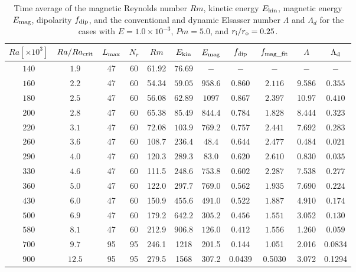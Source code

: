\begin{table}
\caption{Time average of the magnetic Reynolds number $Rm$, kinetic energy $E_{\rm kin}$, magnetic energy $E_{\rm mag}$, dipolarity $f_{\rm dip}$, and {\color{red} the conventional and dynamic Elsasser number $\Lambda$ and $\Lambda_{d}$ for the cases with $E = 1.0 \times 10^{-3}$, $Pm = 5.0$, and} $r_{\rm i}/r_{\rm o} = 0.25$.}
  \begin{tabular}{ccccccccccc}
    \hline
     $Ra[\times 10^3]$  &  $Ra/Ra_{\rm crit}$& 
     {\color{red} $L_{\rm max}$} & {\color{red} $N_{r}$} & {\color{red} $Rm$} & $E_{\rm kin}$  &  $E_{\rm mag}$ & $f_{\rm dip}$ & $f_{\rm mag\_fit}$ & $\Lambda$ & $\Lambda_{\rm d}$\\
    \hline 
    $140$  & $1.9$ & 47 & 60 & 61.92 &  $76.69$ & $-$ & $-$ & $-$ & $-$ & $-$\\
    $160$  & $2.2$ & 47 & 60 & 54.34 &  $59.05$ & $958.6$ & $0.860$ & $2.116$ & 9.586 & $0.355$\\
    $180$  & $2.5$ & 47 & 60 & 56.08 &  $62.89$ & $1097$ & $0.867$ & $2.397$ & 10.97 & $0.410$\\
    $200$  & $2.8$ & 47 & 60 & 65.38 &  $85.49$ & $844.4$ & $0.784$ & $1.828$ & 8.444 & $0.323$\\
    $220$  & $3.1$ & 47 & 60 & 72.08 &  $103.9$ & $769.2$ & $0.757$ & $2.441$ & 7.692 & $0.283$\\
    $260$  & $3.6$ & 47 & 60 & 108.7 &  $236.4$ & $48.4$ & $0.644$ & $2.477$ & 0.484 & $0.021$\\
    $290$  & $4.0$ & 47 & 60 & 120.3 &  $289.3$ & $83.0$ & $0.620$ & $2.610$ & 0.830 & $0.035$\\
    $330$  & $4.6$ & 47 & 60 & 111.5 &  $248.6$ & $753.8$ & $0.602$ & $2.287$ & 7.538 & $0.277$\\
    $360$  & $5.0$ & 47 & 60 & 122.0 &  $297.7$ & $769.0$ & $0.562$ & $1.935$ & 7.690 & $0.224$\\
    $430$  & $6.0$ & 47 & 60 & 150.9 &  $455.6$ & $491.0$ & $0.522$ & $1.887$ & 4.910 & $0.174$\\
    $500$  & $6.9$ & 47 & 60 & 179.2 &  $642.2$ & $305.2$ & $0.456$ & $1.551$ & 3.052 & $0.130$\\
    $580$  & $8.1$ & 47 & 60 & 212.9 &  $906.8$ & $126.0$ & $0.412$ & $1.556$ & 1.260 & $0.059$\\
    $700$  & $9.7$ & 95 & 95 & 246.1 &  1218 & 201.5 & 0.144 & 1.051 & 2.016 & 0.0834 \\
    $900$  & $12.5$ & 95 & 95 & 279.5 &  1568 & 307.2 & 0.0439 & 0.5030 & 3.072 & 0.1294 \\
    \hline
  \end{tabular}
 \label{table:Summary_25}
\end{table}
 
